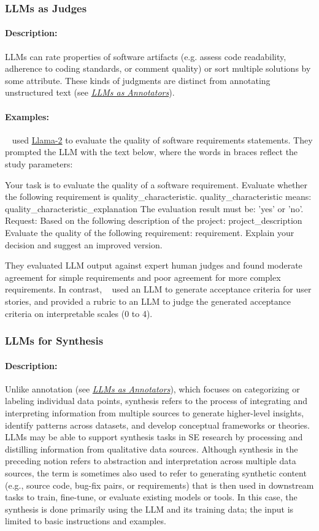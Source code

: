 \documentclass[smallextended]{svjour3}
\newcommand{\annotators}{\hyperref[sec:llms-as-annotators]{\emph{LLMs as Annotators}}\xspace}
\newcommand{\annotators}{\href{/study-types\#llms-as-annotators}{\emph{LLMs as Annotators}}\xspace}
\newcommand{\studytypesubsection}[1]{\subsubsection{#1}}
\newcommand{\studytypeparagraph}[1]{\paragraph{\bfseries #1:}}
\newcommand{\studytypesubsection}[1]{\subsection{#1}}
\newcommand{\studytypeparagraph}[1]{\subsubsection{#1}}
\begin{document}
\studytypesubsection{LLMs as Judges}
\label{sec:llms-as-judges}

\studytypeparagraph{Description}

LLMs can rate properties of software artifacts (e.g. assess code readability, adherence to coding standards, or comment quality) or sort multiple solutions by some attribute. These kinds of judgments are distinct from annotating unstructured text (see \annotators).

\studytypeparagraph{Examples}

\citeauthor{DBLP:conf/re/LubosFTGMEL24}~\cite{DBLP:conf/re/LubosFTGMEL24} used \href{https://www.llama.com/llama2/}{Llama-2} to evaluate the quality of software requirements statements. 
They prompted the LLM with the text below, where the words in braces reflect the study parameters:

\begin{plain}
Your task is to evaluate the quality of a software requirement.
Evaluate whether the following requirement is {quality_characteristic}.
{quality_characteristic} means: {quality_characteristic_explanation}
The evaluation result must be: 'yes' or 'no'.
Request: Based on the following description of the project: {project_description}
Evaluate the quality of the following requirement: {requirement}.
Explain your decision and suggest an improved version.
\end{plain}

They evaluated LLM output against expert human judges and found moderate agreement for simple requirements and poor agreement for more complex requirements. In contrast, \citeauthor{DBLP:conf/kbse/WangALHTASL25}~\cite{DBLP:conf/kbse/WangALHTASL25} used an LLM to generate acceptance criteria for user stories, and provided a rubric to an LLM to judge the generated acceptance criteria on interpretable scales (0 to 4). 
 
\studytypesubsection{LLMs for Synthesis}
\label{sec:llms-for-synthesis}

\studytypeparagraph{Description}

Unlike annotation (see \annotators), which focuses on categorizing or labeling individual data points, synthesis refers to the process of integrating and interpreting information from multiple sources to generate higher-level insights, identify patterns across datasets, and develop conceptual frameworks or theories. LLMs may be able to support synthesis tasks in SE research by processing and distilling information from qualitative data sources. 
Although synthesis in the preceding notion refers to abstraction and interpretation across multiple data sources, the term is sometimes also used to refer to generating synthetic content (e.g., source code, bug-fix pairs, or requirements) that is then used in downstream tasks to train, fine-tune, or evaluate existing models or tools.
In this case, the synthesis is done primarily using the LLM and its training data; the input is limited to basic instructions and examples.
\end{document}
